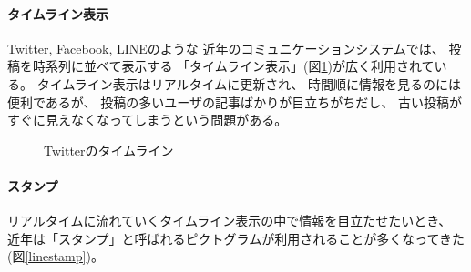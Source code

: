 

\vspace{2mm}
\paragraph*{タイムライン表示}

Twitter, Facebook, LINEのような
近年のコミュニケーションシステムでは、
投稿を時系列に並べて表示する
「タイムライン表示」(図\ref{twitter})が広く利用されている。
%
タイムライン表示はリアルタイムに更新され、
時間順に情報を見るのには便利であるが、
投稿の多いユーザの記事ばかりが目立ちがちだし、
古い投稿がすぐに見えなくなってしまうという問題がある。

\begin{figure}[H]
\centering{}
\caption{Twitterのタイムライン}
\label{twitter}
\end{figure}

\vspace{1mm}
\paragraph*{スタンプ}

リアルタイムに流れていくタイムライン表示の中で情報を目立たせたいとき、
近年は「スタンプ」と呼ばれるピクトグラムが利用されることが多くなってきた(図\ref{linestamp})。

